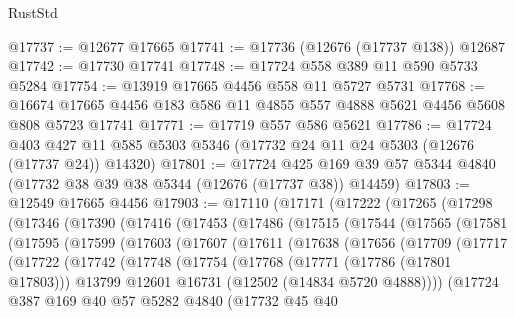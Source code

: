 \begin{lexlean}{RustStd}
\begin{coremodule}
@17737 := @12677 @17665
@17741 := @17736 (@12676 (@17737 @138)) @12687
@17742 := @17730 @17741
@17748 := @17724 @558 @389 @11 @590 @5733 @5284
@17754 := @13919 @17665 @4456 @558 @11 @5727 @5731
@17768 := @16674 @17665 @4456 @183 @586 @11 @4855 @557 @4888 @5621 @4456 @5608 @808 @5723 @17741
@17771 := @17719 @557 @586 @5621
@17786 := @17724
    @403
    @427
    @11
    @585
    @5303
    @5346
    (@17732 @24 @11 @24 @5303 (@12676 (@17737 @24)) @14320)
@17801 := @17724
    @425
    @169
    @39
    @57
    @5344
    @4840
    (@17732 @38 @39 @38 @5344 (@12676 (@17737 @38)) @14459)
@17803 := @12549 @17665 @4456
@17903 := @17110
    (@17171
      (@17222
        (@17265
          (@17298
            (@17346
              (@17390
                (@17416
                  (@17453
                    (@17486
                      (@17515
                        (@17544
                          (@17565
                            (@17581
                              (@17595
                                (@17599
                                  (@17603
                                    (@17607
                                      (@17611
                                        (@17638
                                          (@17656
                                            (@17709
                                              (@17717
                                                (@17722
                                                  (@17742
                                                    (@17748
                                                      (@17754
                                                        (@17768
                                                          (@17771 (@17786 (@17801 @17803)))
                                                          @13799
                                                          @12601
                                                          @16731
                                                          (@12502 (@14834 @5720 @4888))))
                                                      (@17724
                                                        @387
                                                        @169
                                                        @40
                                                        @57
                                                        @5282
                                                        @4840
                                                        (@17732
                                                          @45
                                                          @40

\end{coremodule}
\end{lexlean}
